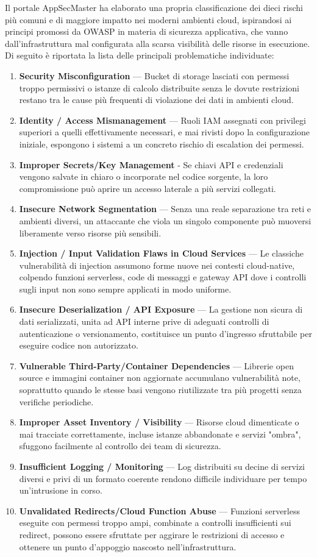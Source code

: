 Il portale AppSecMaster ha elaborato una propria classificazione dei dieci rischi più comuni e di maggiore impatto nei moderni ambienti cloud, ispirandosi ai principi promossi da OWASP in materia di sicurezza applicativa, che vanno dall'infrastruttura mal configurata alla scarsa visibilità delle risorse in esecuzione. Di seguito è riportata la lista delle principali problematiche individuate:
\begin{enumerate}
  \item \textbf{Security Misconfiguration} — Bucket di storage lasciati con permessi troppo permissivi o istanze di calcolo distribuite senza le dovute restrizioni restano tra le cause più frequenti di violazione dei dati in ambienti cloud.
  \item \textbf{Identity / Access Mismanagement} — Ruoli IAM assegnati con privilegi superiori a quelli effettivamente necessari, e mai rivisti dopo la configurazione iniziale, espongono i sistemi a un concreto rischio di escalation dei permessi.
  \item \textbf{Improper Secrets/Key Management} - Se chiavi API e credenziali vengono salvate in chiaro o incorporate nel codice sorgente, la loro compromissione può aprire un accesso laterale a più servizi collegati.
  \item \textbf{Insecure Network Segmentation} — Senza una reale separazione tra reti e ambienti diversi, un attaccante che viola un singolo componente può muoversi liberamente verso risorse più sensibili.
  \item \textbf{Injection / Input Validation Flaws in Cloud Services} — Le classiche vulnerabilità di injection assumono forme nuove nei contesti cloud-native, colpendo funzioni serverless, code di messaggi e gateway API dove i controlli sugli input non sono sempre applicati in modo uniforme.
  \item \textbf{Insecure Deserialization / API Exposure} — La gestione non sicura di dati serializzati, unita ad API interne prive di adeguati controlli di autenticazione o versionamento, costituisce un punto d'ingresso sfruttabile per eseguire codice non autorizzato.
  \item \textbf{Vulnerable Third-Party/Container Dependencies} — Librerie open source e immagini container non aggiornate accumulano vulnerabilità note, soprattutto quando le stesse basi vengono riutilizzate tra più progetti senza verifiche periodiche.
  \item \textbf{Improper Asset Inventory / Visibility} — Risorse cloud dimenticate o mai tracciate correttamente, incluse istanze abbandonate e servizi "ombra", sfuggono facilmente al controllo dei team di sicurezza.
  \item \textbf{Insufficient Logging / Monitoring} — Log distribuiti su decine di servizi diversi e privi di un formato coerente rendono difficile individuare per tempo un'intrusione in corso.
  \item \textbf{Unvalidated Redirects/Cloud Function Abuse} — Funzioni serverless eseguite con permessi troppo ampi, combinate a controlli insufficienti sui redirect, possono essere sfruttate per aggirare le restrizioni di accesso e ottenere un punto d'appoggio nascosto nell'infrastruttura.



\end{enumerate}
